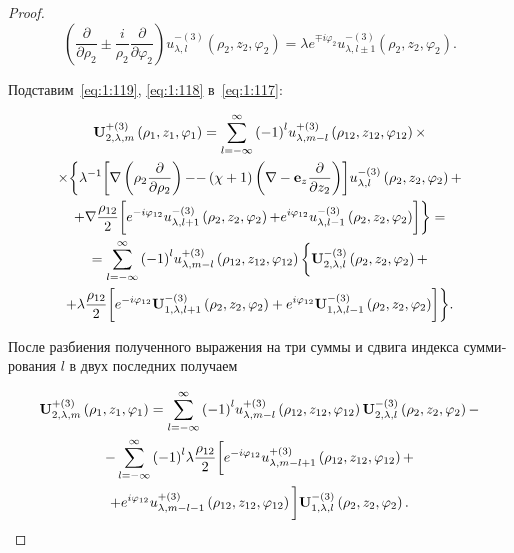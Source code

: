 \begin{russian}
\begin{proof}
\begin{equation}\label{eq:1:119}
\left( {\frac{\partial }{{\partial {\rho _2}}} \pm \frac{i}{{{\rho _2}}}\frac{\partial }{{\partial {\varphi _2}}}} \right)u_{\lambda ,l}^{ - (3)}\left( {{\rho _2},{z_2},{\varphi _2}} \right) = \lambda {e^{ \mp i{\varphi _2}}}u_{\lambda ,l \pm 1}^{ - (3)}\left( {{\rho _2},{z_2},{\varphi _2}} \right).
\end{equation}

Подставим~\eqref{eq:1:119}, \eqref{eq:1:118} в~\eqref{eq:1:117}:

\begin{multline*}
{\bf{U}}_{2,\lambda ,m}^{ + (3)}\left( {{\rho _1},{z_1},{\varphi _1}} \right) = \sum\limits_{l =  - \infty }^\infty  {{{( - 1)}^l}} u_{\lambda ,m - l}^{ + (3)}\left( {{\rho _{12}},{z_{12}},{\varphi _{12}}} \right)\times\\
\times\bigg\{ {{\lambda ^{ - 1}}\bigg[ {\nabla \left( {{\rho _2}\frac{\partial }{{\partial {\rho _2}}}} \right) - }}
{ - \left( {\chi  + 1} \right)\left( {\nabla  - {{\bf{e}}_z}\frac{\partial }{{\partial {z_2}}}} \right)} \bigg]u_{\lambda ,l}^{ - (3)}\left( {{\rho _2},{z_2},{\varphi _2}} \right) + \\
+ \nabla \frac{{{\rho _{12}}}}{2}\bigg[ {{e^{ - i{\varphi _{12}}}}u_{\lambda ,l + 1}^{ - (3)}\left( {{\rho _2},{z_2},{\varphi _2}} \right) + }{{ {e^{i{\varphi _{12}}}}u_{\lambda ,l - 1}^{ - (3)}\left( {{\rho _2},{z_2},{\varphi _2}} \right)} \bigg]} \bigg\} = \\
= \sum\limits_{l =  - \infty }^\infty  {{{( - 1)}^l}} u_{\lambda ,m - l}^{ + (3)}\left( {{\rho _{12}},{z_{12}},{\varphi _{12}}} \right)\bigg\{ {{\bf{U}}_{2,\lambda ,l}^{ - (3)}\left( {{\rho _2},{z_2},{\varphi _2}} \right) + } \\
{ + \lambda \frac{{{\rho _{12}}}}{2}\bigg[ {{e^{ - i{\varphi _{12}}}}{\bf{U}}_{1,\lambda ,l + 1}^{ - (3)}\left( {{\rho _2},{z_2},{\varphi _2}} \right) + {e^{i{\varphi _{12}}}}{\bf{U}}_{1,\lambda ,l - 1}^{ - (3)}\left( {{\rho _2},{z_2},{\varphi _2}} \right)} \bigg]} \bigg\}.
\end{multline*}

После разбиения полученного выражения на три суммы и сдвига индекса суммирования $l$ в двух последних получаем

\begin{multline}\label{eq:1:120}
{\bf{U}}_{2,\lambda ,m}^{ + (3)}\left( {{\rho _1},{z_1},{\varphi _1}} \right) = \sum\limits_{l =  - \infty }^\infty  {{{( - 1)}^l}} u_{\lambda ,m - l}^{ + (3)}\left( {{\rho _{12}},{z_{12}},{\varphi _{12}}} \right){\bf{U}}_{2,\lambda ,l}^{ - (3)}\left( {{\rho _2},{z_2},{\varphi _2}} \right) - \\
- \sum\limits_{l =  - \infty }^\infty  {{{( - 1)}^l}} \lambda \frac{{{\rho _{12}}}}{2}\bigg[ {e^{ - i{\varphi _{12}}}}u_{\lambda ,m - l + 1}^{ + (3)}\left( {{\rho _{12}},{z_{12}},{\varphi _{12}}} \right) + \\
+ {e^{i{\varphi _{12}}}}u_{\lambda ,m - l - 1}^{ + (3)}\left( {{\rho _{12}},{z_{12}},{\varphi _{12}}} \right) \bigg]{\bf{U}}_{1,\lambda ,l}^{ - (3)}\left( {{\rho _2},{z_2},{\varphi _2}} \right).
\end{multline}


\end{proof}
\end{russian}
